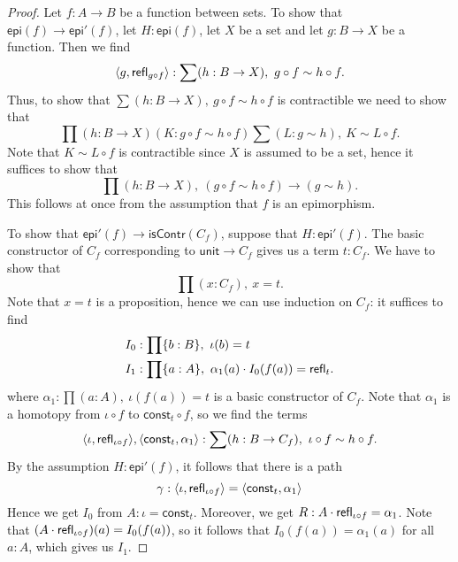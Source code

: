 \begin{proof}
Let $f:A\to B$ be a function between sets.
To show that $\mathsf{epi}(f)\to\mathsf{epi}'(f)$, let $H:\mathsf{epi}(f)$,
let $X$ be a set and let $g:B\to X$ be a function. Then we find
\begin{equation*}
\pairr{g,\refl{g\circ f}}:\sum(h:B\to X),\ g\circ f\sim h\circ f.
\end{equation*}
Thus, to show that $\sum(h:B\to X),\ g\circ f\sim h\circ f$ 
is contractible we need to show that
\begin{equation*}
\prod(h:B\to X)(K:g\circ f\sim h\circ f)\sum(L:g\sim h),\ K\sim L\circ f.
\end{equation*}
Note that $K\sim L\circ f$ is contractible since $X$ is assumed to be a set,
hence it suffices to show that
\begin{equation*}
\prod(h:B\to X),\ (g\circ f\sim h\circ f)\to (g\sim h).
\end{equation*}
This follows at once from the assumption that $f$ is an epimorphism.

To show that $\mathsf{epi}'(f)\to\mathsf{isContr}(C_f)$, suppose that
$H:\mathsf{epi}'(f)$. The basic constructor of $C_f$ corresponding to
$\mathsf{unit}\to C_f$ gives us a term $t:C_f$. We have to show that
\begin{equation*}
\prod(x:C_f),\ x= t.
\end{equation*}
Note that $x= t$ is a proposition, hence we can use induction on
$C_f$: it suffices to find
\begin{align*}
I_0 & : \prod\{b:B\},\ \iota(b)= t\\
I_1 & : \prod\{a:A\},\ \alpha_1(a)\cdot I_0(f(a))=\mathsf{refl}_{t}.
\end{align*}
where $\alpha_1:\prod(a:A),\ \iota(f(a))= t$ is a basic constructor
of $C_f$. Note that $\alpha_1$ is a homotopy from $\iota\circ f$ to
$\mathsf{const}_t\circ f$, so we find the terms
\begin{equation*}
\pairr{\iota,\refl{\iota\circ f}},\pairr{\mathsf{const}_t,\alpha_1}:
\sum(h:B\to C_f),\ \iota\circ f\sim h\circ f.
\end{equation*}
By the assumption $H:\mathsf{epi}'(f)$, it follows that there is a path
\begin{equation*}
\gamma:{\langle \iota,\mathsf{refl}_{\iota\circ f}\rangle}={\langle \mathsf{const}_t,\alpha_1\rangle}
\end{equation*}
Hence we get $I_0$ from $A:\iota=\mathsf{const}_t$. Moreover,
we get $ R:A\cdot\mathsf{refl}_{\iota\circ f}=\alpha_1$.
Note that $(A\cdot\mathsf{refl}_{\iota\circ f})(a)= I_0(f(a))$, so it follows
that $I_0(f(a))= \alpha_1(a)$ for all $a:A$, which gives us $I_1$.


\end{proof}
